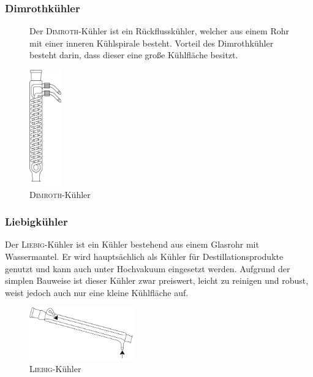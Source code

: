 \subsubsection*{Dimrothkühler}

\begin{figure}[h!]
	\begin{minipage}[t]{0.4\textwidth}
		\vspace{0pt}
		Der \textsc{Dimroth}-Kühler ist ein Rückflusskühler, welcher aus einem Rohr mit einer inneren Kühlspirale besteht. Vorteil des Dimrothkühler besteht darin, dass dieser eine große Kühlfläche besitzt.
	\end{minipage}
	\hfill
	\hspace{1mm}
	\begin{minipage}[t]{0.6\textwidth}
		\vspace{0pt}
		\centering
		\includegraphics[height=5cm]{img/dimroth}
		\caption{\textsc{Dimroth}-Kühler}
		\label{fig:dimroth}
	\end{minipage}
\end{figure}
\FloatBarrier

\subsubsection*{Liebigkühler}
Der \textsc{Liebig}-Kühler ist ein Kühler bestehend aus einem Glasrohr mit Wassermantel. Er wird hauptsächlich als Kühler für Destillationsprodukte genutzt und kann auch unter Hochvakuum eingesetzt werden. Aufgrund der simplen Bauweise ist dieser Kühler zwar preiswert, leicht zu reinigen und robust, weist jedoch auch nur eine kleine Kühlfläche auf.
\begin{figure}[h!]
	\centering
	\includegraphics[width=0.4\textwidth]{img/liebigkuehler}
	\caption{\textsc{Liebig}-Kühler}
	\label{fig:liebigkuehler}
\end{figure}
\FloatBarrier

